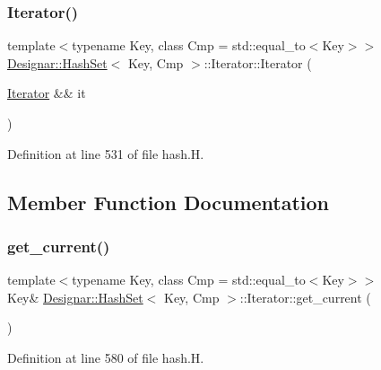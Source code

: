 \subsubsection{\texorpdfstring{Iterator()}{Iterator()}\hspace{0.1cm}{\footnotesize\ttfamily [5/5]}}
{\footnotesize\ttfamily template$<$typename Key, class Cmp = std\+::equal\+\_\+to$<$\+Key$>$$>$ \\
\hyperlink{class_designar_1_1_hash_set}{Designar\+::\+Hash\+Set}$<$ Key, Cmp $>$\+::Iterator\+::\+Iterator (\begin{DoxyParamCaption}\item[{\hyperlink{class_designar_1_1_hash_set_1_1_iterator}{Iterator} \&\&}]{it }\end{DoxyParamCaption})\hspace{0.3cm}{\ttfamily [inline]}}



Definition at line 531 of file hash.\+H.



\subsection{Member Function Documentation}
\mbox{\label{class_designar_1_1_hash_set_1_1_iterator_af954a7cf3f23fecf898b86030e808224}} 
\subsubsection{\texorpdfstring{get\+\_\+current()}{get\_current()}\hspace{0.1cm}{\footnotesize\ttfamily [1/2]}}
{\footnotesize\ttfamily template$<$typename Key, class Cmp = std\+::equal\+\_\+to$<$\+Key$>$$>$ \\
Key\& \hyperlink{class_designar_1_1_hash_set}{Designar\+::\+Hash\+Set}$<$ Key, Cmp $>$\+::Iterator\+::get\+\_\+current (\begin{DoxyParamCaption}{ }\end{DoxyParamCaption})\hspace{0.3cm}{\ttfamily [inline]}}



Definition at line 580 of file hash.\+H.

